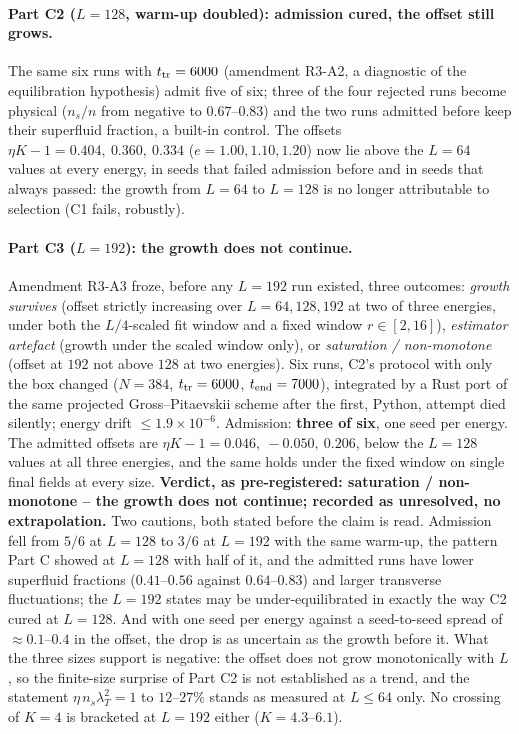 \documentclass[11pt,a4paper]{article}
\begin{document}
\paragraph{Part C2 ($L=128$, warm-up doubled): admission cured, the offset still grows.} The same six runs with
$t_{\rm tr}=6000$ (amendment R3-A2, a diagnostic of the equilibration hypothesis) admit five of six; three of the
four rejected runs become physical ($n_s/n$ from negative to $0.67$--$0.83$) and the two runs admitted before keep
their superfluid fraction, a built-in control. The offsets $\eta K-1=0.404,\ 0.360,\ 0.334$ ($e=1.00,1.10,1.20$)
now lie above the $L=64$ values at every energy, in seeds that failed admission before and in seeds that always
passed: the growth from $L=64$ to $L=128$ is no longer attributable to selection (C1 fails, robustly).

\paragraph{Part C3 ($L=192$): the growth does not continue.} Amendment R3-A3 froze, before any $L=192$ run
existed, three outcomes: \emph{growth survives} (offset strictly increasing over $L=64,128,192$ at two of three
energies, under both the $L/4$-scaled fit window and a fixed window $r\in[2,16]$), \emph{estimator artefact}
(growth under the scaled window only), or \emph{saturation / non-monotone} (offset at $192$ not above $128$ at two
energies). Six runs, C2's protocol with only the box changed ($N=384$, $t_{\rm tr}=6000$, $t_{\rm end}=7000$),
integrated by a Rust port of the same projected Gross--Pitaevskii scheme after the first, Python, attempt died
silently; energy drift $\le1.9\times10^{-6}$. Admission: \textbf{three of six}, one seed per energy. The admitted
offsets are $\eta K-1=0.046,\ -0.050,\ 0.206$, below the $L=128$ values at all three energies, and the same holds
under the fixed window on single final fields at every size. \textbf{Verdict, as pre-registered: saturation /
non-monotone -- the growth does not continue; recorded as unresolved, no extrapolation.} Two cautions, both
stated before the claim is read. Admission fell from $5/6$ at $L=128$ to $3/6$ at $L=192$ with the same warm-up, the
pattern Part C showed at $L=128$ with half of it, and the admitted runs have lower superfluid fractions ($0.41$--$0.56$
against $0.64$--$0.83$) and larger transverse fluctuations; the $L=192$ states may be under-equilibrated in exactly
the way C2 cured at $L=128$. And with one seed per energy against a seed-to-seed spread of $\approx0.1$--$0.4$ in the
offset, the drop is as uncertain as the growth before it. What the three sizes support is negative: the offset does
not grow monotonically with $L$, so the finite-size surprise of Part C2 is not established as a trend, and the
statement $\eta\,n_s\lambda_T^2=1$ to $12$--$27\%$ stands as measured at $L\le64$ only. No crossing of $K=4$ is
bracketed at $L=192$ either ($K=4.3$--$6.1$).
\end{document}
